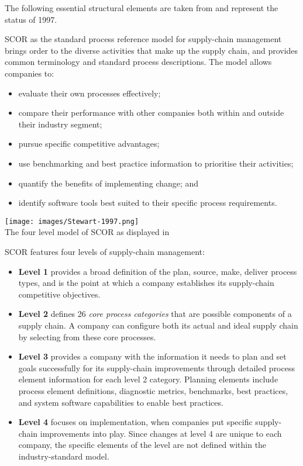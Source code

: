 \documentclass[11pt,a4paper]{article}
\begin{document}
The following essential structural elements are taken from \cite{Stewart1997}
and represent the status of 1997.

SCOR as the standard process reference model for supply-chain management
brings order to the diverse activities that make up the supply chain, and
provides common terminology and standard process descriptions. The model
allows companies to:
\begin{itemize}
\item evaluate their own processes effectively;
\item compare their performance with other companies both within and outside
  their industry segment;
\item pursue specific competitive advantages;
\item use benchmarking and best practice information to prioritise their
  activities;
\item quantify the benefits of implementing change; and
\item identify software tools best suited to their specific process
  requirements.
\end{itemize}

\begin{center}
  \texttt{[image: images/Stewart-1997.png]}\\
  The four level model of SCOR as displayed in \cite{Stewart1997}
\end{center}

SCOR features four levels of supply-chain management:
\begin{itemize}
\item \textbf{Level 1} provides a broad definition of the plan, source, make,
  deliver process types, and is the point at which a company establishes its
  supply-chain competitive objectives.
\item \textbf{Level 2} defines 26 \emph{core process categories} that are
  possible components of a supply chain. A company can configure both its
  actual and ideal supply chain by selecting from these core processes.
\item \textbf{Level 3} provides a company with the information it needs to
  plan and set goals successfully for its supply-chain improvements through
  detailed process element information for each level 2 category. Planning
  elements include process element definitions, diagnostic metrics,
  benchmarks, best practices, and system software capabilities to enable best
  practices.
\item \textbf{Level 4} focuses on implementation, when companies put specific
  supply-chain improvements into play. Since changes at level 4 are unique to
  each company, the specific elements of the level are not defined within the
  industry-standard model.
\end{itemize}
\end{document}
